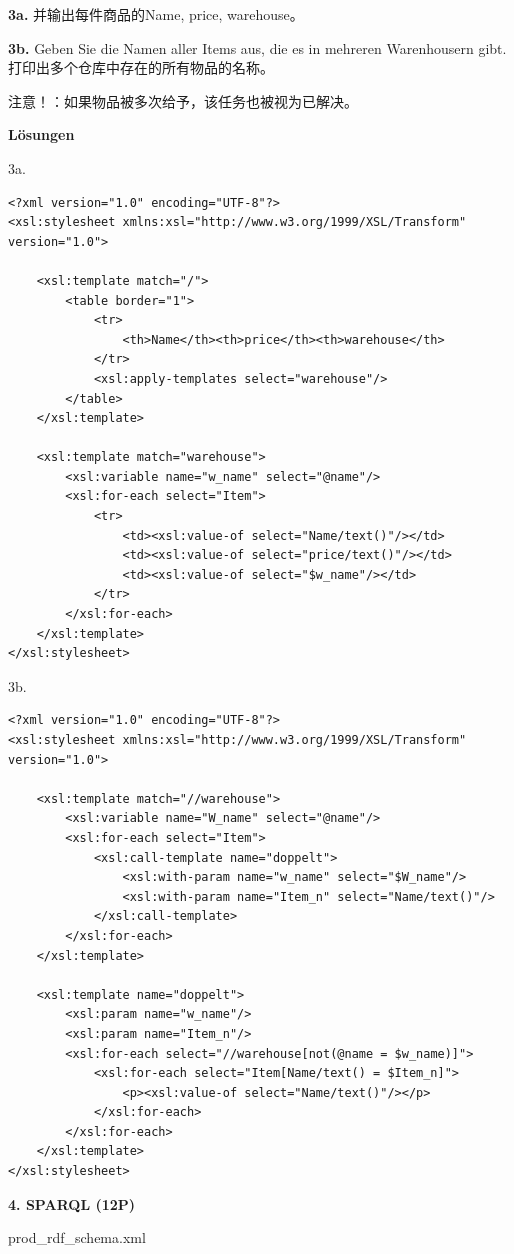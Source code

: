\documentclass[fontset=windows]{article}
\begin{document}
\textbf{3a. } 并输出每件商品的Name, price, warehouse。

\textbf{3b. } Geben Sie die Namen aller Items aus, die es in mehreren Warenhousern gibt.
打印出多个仓库中存在的所有物品的名称。

注意！：如果物品被多次给予，该任务也被视为已解决。

\textbf{Lösungen}

3a.
\begin{verbatim}
<?xml version="1.0" encoding="UTF-8"?>
<xsl:stylesheet xmlns:xsl="http://www.w3.org/1999/XSL/Transform" version="1.0">

  	<xsl:template match="/">
    	<table border="1">
      		<tr>
        		<th>Name</th><th>price</th><th>warehouse</th>
      		</tr>
      		<xsl:apply-templates select="warehouse"/>
    	</table>
  	</xsl:template>

  	<xsl:template match="warehouse">
    	<xsl:variable name="w_name" select="@name"/>
    	<xsl:for-each select="Item">
      		<tr>
        		<td><xsl:value-of select="Name/text()"/></td>
        		<td><xsl:value-of select="price/text()"/></td>
        		<td><xsl:value-of select="$w_name"/></td>
      		</tr>
    	</xsl:for-each>
  	</xsl:template>
</xsl:stylesheet>
\end{verbatim}

3b.

\begin{verbatim}
<?xml version="1.0" encoding="UTF-8"?>
<xsl:stylesheet xmlns:xsl="http://www.w3.org/1999/XSL/Transform" version="1.0">
  
  	<xsl:template match="//warehouse">
    	<xsl:variable name="W_name" select="@name"/>
    	<xsl:for-each select="Item">
      		<xsl:call-template name="doppelt">
        		<xsl:with-param name="w_name" select="$W_name"/>
        		<xsl:with-param name="Item_n" select="Name/text()"/>
      		</xsl:call-template>
    	</xsl:for-each>
  	</xsl:template>
  
  	<xsl:template name="doppelt">
    	<xsl:param name="w_name"/>
    	<xsl:param name="Item_n"/>
    	<xsl:for-each select="//warehouse[not(@name = $w_name)]">
      		<xsl:for-each select="Item[Name/text() = $Item_n]">
        		<p><xsl:value-of select="Name/text()"/></p>
      		</xsl:for-each>
    	</xsl:for-each>
  	</xsl:template>
</xsl:stylesheet>
\end{verbatim}

\noindent\textbf{4. SPARQL (12P)}

prod\_rdf\_schema.xml
\end{document}
